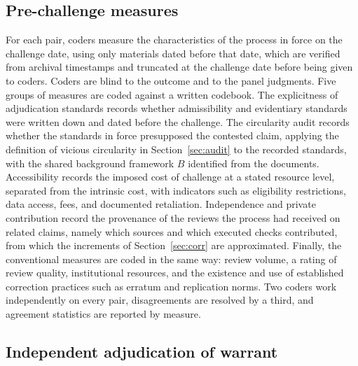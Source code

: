 \documentclass[11pt]{article}
\theoremstyle{remark}
\begin{document}
\subsection{Pre-challenge measures}

For each pair, coders measure the characteristics of the process in force on the challenge date, using only materials dated before that date, which are verified from archival timestamps and truncated at the challenge date before being given to coders. Coders are blind to the outcome and to the panel judgments. Five groups of measures are coded against a written codebook. The explicitness of adjudication standards records whether admissibility and evidentiary standards were written down and dated before the challenge. The circularity audit records whether the standards in force presupposed the contested claim, applying the definition of vicious circularity in Section~\ref{sec:audit} to the recorded standards, with the shared background framework $B$ identified from the documents. Accessibility records the imposed cost of challenge at a stated resource level, separated from the intrinsic cost, with indicators such as eligibility restrictions, data access, fees, and documented retaliation. Independence and private contribution record the provenance of the reviews the process had received on related claims, namely which sources and which executed checks contributed, from which the increments of Section~\ref{sec:corr} are approximated. Finally, the conventional measures are coded in the same way: review volume, a rating of review quality, institutional resources, and the existence and use of established correction practices such as erratum and replication norms. Two coders work independently on every pair, disagreements are resolved by a third, and agreement statistics are reported by measure.

\subsection{Independent adjudication of warrant}
\end{document}
